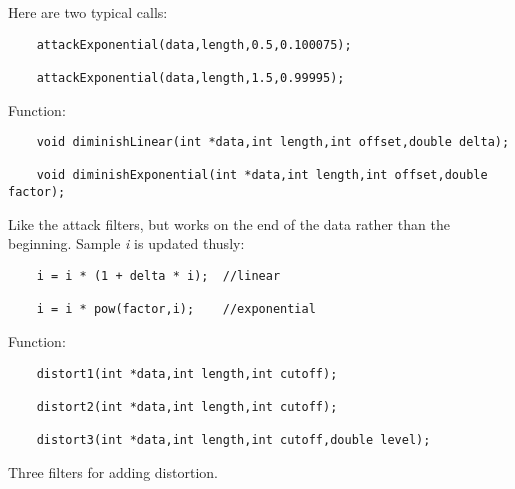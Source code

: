 \documentclass{article}
\begin{document}
Here are two typical calls:

\begin{verbatim}
    attackExponential(data,length,0.5,0.100075);

    attackExponential(data,length,1.5,0.99995);
\end{verbatim}

\htmlrule

Function:

\begin{verbatim}
    void diminishLinear(int *data,int length,int offset,double delta);

    void diminishExponential(int *data,int length,int offset,double factor);
\end{verbatim}

Like the attack filters, but works on the end of the data rather than
the beginning. Sample \emph{i} is updated thusly:

\begin{verbatim}
    i = i * (1 + delta * i);  //linear

    i = i * pow(factor,i);    //exponential
\end{verbatim}

\htmlrule

Function:

\begin{verbatim}
    distort1(int *data,int length,int cutoff);

    distort2(int *data,int length,int cutoff);

    distort3(int *data,int length,int cutoff,double level);
\end{verbatim}

Three filters for adding distortion.
\end{document}
